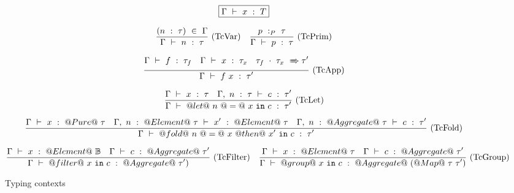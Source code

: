 \begin{figure*}

$$
\boxed{\Gamma ~\vdash~ x ~:~ T}
$$


$$
\frac {\displaystyle 
    (n~:~\tau) ~\in~ \Gamma
} {\displaystyle  
    \Gamma ~\vdash~ n ~:~ \tau
} \ 
\textrm{(TcVar)}
\quad
\frac {\displaystyle 
    p ~:_{P}~ \tau
} {\displaystyle 
    \Gamma ~\vdash~ p ~:~ \tau
} \ 
\textrm{(TcPrim)}
$$

$$
\frac {\displaystyle 
    \Gamma ~\vdash~ f ~:~ \tau_f
    \quad
    \Gamma ~\vdash~ x ~:~ \tau_x
    \quad
    \tau_f~\cdot~\tau_x ~\xRightarrow~ \tau'
} {\displaystyle 
    \Gamma ~\vdash~ f~x ~:~ \tau'
} \ 
\textrm{(TcApp)}
$$


$$
\frac {\displaystyle 
    \Gamma ~\vdash~ x ~:~ \tau
    \quad
    \Gamma,~n~:~\tau ~\vdash~ c ~:~ \tau'
} {\displaystyle 
    \Gamma ~\vdash~ @let@~n~@=@~x~\mathtt{in}~c ~:~ \tau'
} \ 
\textrm{(TcLet)}
$$

$$
\frac {\displaystyle 
    \Gamma ~\vdash~ x ~:~ @Pure@~\tau
    \quad
    \Gamma,~n~:~@Element@~\tau ~\vdash~ x' ~:~ @Element@~\tau
    \quad
    \Gamma,~n~:~@Aggregate@~\tau ~\vdash~ c ~:~ \tau'
} {\displaystyle 
    \Gamma ~\vdash~ @fold@~n~@=@~x~@then@~x'~\mathtt{in}~c ~:~ \tau'
} \ 
\textrm{(TcFold)}
$$

$$
\frac {\displaystyle 
    \Gamma ~\vdash~ x ~:~ @Element@~\mathbb{B}
    \quad
    \Gamma ~\vdash~ c ~:~ @Aggregate@~\tau'
} {\displaystyle 
    \Gamma ~\vdash~ @filter@~x~\mathtt{in}~c ~:~ @Aggregate@~\tau')
} \ 
\textrm{(TcFilter)}
\quad
\frac {\displaystyle 
    \Gamma ~\vdash~ x ~:~ @Element@~\tau
    \quad
    \Gamma ~\vdash~ c ~:~ @Aggregate@~\tau'
} {\displaystyle 
    \Gamma ~\vdash~ @group@~x~\mathtt{in}~c ~:~ @Aggregate@~(@Map@~\tau~\tau')
} \ 
\textrm{(TcGroup)}
$$



\caption{Typing contexts}
\label{fig:source:type:ctx}
\end{figure*}

